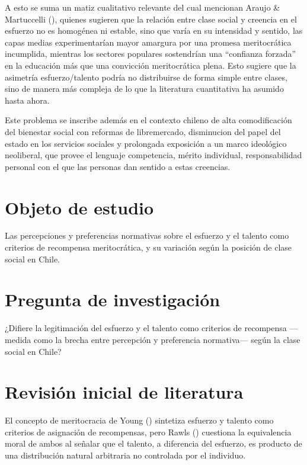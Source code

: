 \documentclass[
  spanish,
  a4paper,
  oneside]{scrbook}
\begin{document}
A esto se suma un matiz cualitativo relevante del cual mencionan Araujo
\& Martuccelli (), quienes
sugieren que la relación entre clase social y creencia en el esfuerzo no
es homogénea ni estable, sino que varía en su intensidad y sentido, las
capas medias experimentarían mayor amargura por una promesa
meritocrática incumplida, mientras los sectores populares sostendrían
una ``confianza forzada'' en la educación más que una convicción
meritocrática plena. Esto sugiere que la asimetría esfuerzo/talento
podría no distribuirse de forma simple entre clases, sino de manera más
compleja de lo que la literatura cuantitativa ha asumido hasta ahora.

Este problema se inscribe además en el contexto chileno de alta
comodificación del bienestar social con reformas de libremercado,
disminucion del papel del estado en los servicios sociales y prolongada
exposición a un marco ideológico neoliberal, que provee el lenguaje
competencia, mérito individual, responsabilidad personal con el que las
personas dan sentido a estas creencias.

\section{Objeto de estudio}\label{objeto-de-estudio}

Las percepciones y preferencias normativas sobre el esfuerzo y el
talento como criterios de recompensa meritocrática, y su variación según
la posición de clase social en Chile.

\section{Pregunta de investigación}\label{pregunta-de-investigaciuxf3n}

¿Difiere la legitimación del esfuerzo y el talento como criterios de
recompensa ---medida como la brecha entre percepción y preferencia
normativa--- según la clase social en Chile?

\section{Revisión inicial de
literatura}\label{revisiuxf3n-inicial-de-literatura}

El concepto de meritocracia de Young
() sintetiza esfuerzo y talento como
criterios de asignación de recompensas, pero Rawls
() cuestiona la equivalencia moral de
ambos al señalar que el talento, a diferencia del esfuerzo, es producto
de una distribución natural arbitraria no controlada por el individuo.
\end{document}
